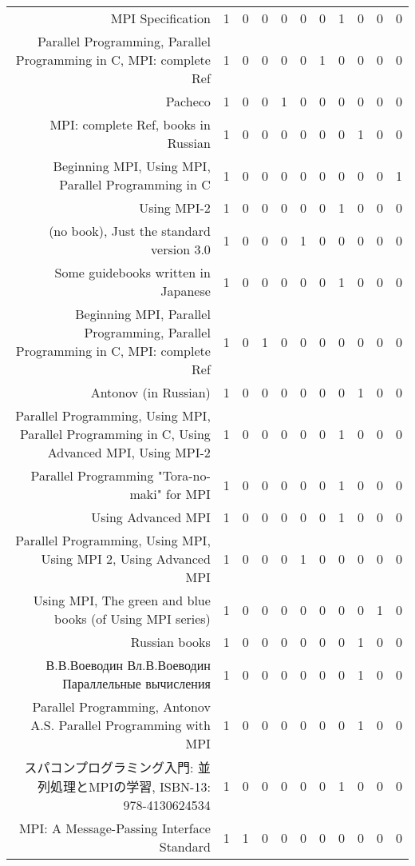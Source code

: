 {\begin{landscape}
\begin{longtable}[htb]{r|c|c|c|c|c|c|c|c|c|c}
{MPI Specification} & 1 & 0 & 0 & 0 & 0 & 0 & 1 & 0 & 0 & 0 \\%
{Parallel Programming, Parallel Programming in C, MPI: complete Ref} & 1 & 0 & 0 & 0 & 0 & 1 & 0 & 0 & 0 & 0 \\%
{Pacheco} & 1 & 0 & 0 & 1 & 0 & 0 & 0 & 0 & 0 & 0 \\%
{MPI: complete Ref, books in Russian} & 1 & 0 & 0 & 0 & 0 & 0 & 0 & 1 & 0 & 0 \\%
{Beginning MPI, Using MPI, Parallel Programming in C} & 1 & 0 & 0 & 0 & 0 & 0 & 0 & 0 & 0 & 1 \\%
{Using MPI-2} & 1 & 0 & 0 & 0 & 0 & 0 & 1 & 0 & 0 & 0 \\%
{(no book), Just the standard version 3.0} & 1 & 0 & 0 & 0 & 1 & 0 & 0 & 0 & 0 & 0 \\%
{Some guidebooks written in Japanese} & 1 & 0 & 0 & 0 & 0 & 0 & 1 & 0 & 0 & 0 \\%
{Beginning MPI, Parallel Programming, Parallel Programming in C, MPI: complete Ref} & 1 & 0 & 1 & 0 & 0 & 0 & 0 & 0 & 0 & 0 \\%
{Antonov (in Russian)} & 1 & 0 & 0 & 0 & 0 & 0 & 0 & 1 & 0 & 0 \\%
{Parallel Programming, Using MPI, Parallel Programming in C, Using Advanced MPI, Using MPI-2} & 1 & 0 & 0 & 0 & 0 & 0 & 1 & 0 & 0 & 0 \\%
{Parallel Programming "Tora-no-maki" for MPI} & 1 & 0 & 0 & 0 & 0 & 0 & 1 & 0 & 0 & 0 \\%
{Using Advanced MPI} & 1 & 0 & 0 & 0 & 0 & 0 & 1 & 0 & 0 & 0 \\%
{Parallel Programming, Using MPI, Using MPI 2, Using Advanced MPI} & 1 & 0 & 0 & 0 & 1 & 0 & 0 & 0 & 0 & 0 \\%
{Using MPI, The green and blue books (of Using MPI series)} & 1 & 0 & 0 & 0 & 0 & 0 & 0 & 0 & 1 & 0 \\%
{Russian books} & 1 & 0 & 0 & 0 & 0 & 0 & 0 & 1 & 0 & 0 \\%
{В.В.Воеводин Вл.В.Воеводин Параллельные вычисления} & 1 & 0 & 0 & 0 & 0 & 0 & 0 & 1 & 0 & 0 \\%
{Parallel Programming, Antonov A.S. Parallel Programming with MPI} & 1 & 0 & 0 & 0 & 0 & 0 & 0 & 1 & 0 & 0 \\%
{スパコンプログラミング入門: 並列処理とMPIの学習, ISBN-13: 978-4130624534} & 1 & 0 & 0 & 0 & 0 & 0 & 1 & 0 & 0 & 0 \\%
{MPI: A Message-Passing Interface Standard} & 1 & 1 & 0 & 0 & 0 & 0 & 0 & 0 & 0 & 0 \\%

\end{longtable}
\end{landscape}}
